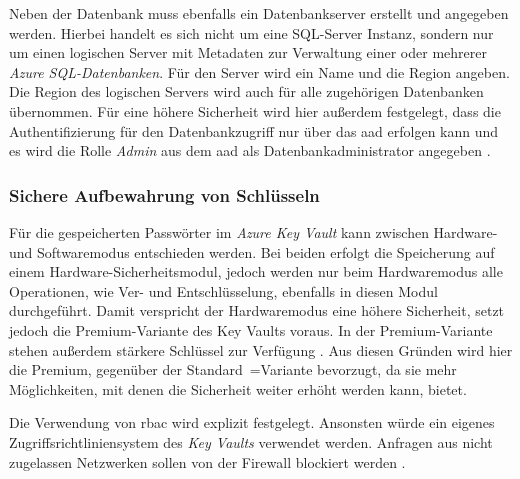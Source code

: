 Neben der Datenbank muss ebenfalls ein Datenbankserver erstellt und angegeben werden. Hierbei handelt es sich nicht um eine SQL-Server Instanz, sondern nur um einen logischen Server mit Metadaten zur Verwaltung einer oder mehrerer \textit{Azure SQL-Datenbanken}. Für den Server wird ein Name und die Region angeben. Die Region des logischen Servers wird auch für alle zugehörigen Datenbanken übernommen. Für eine höhere Sicherheit wird hier außerdem festgelegt, dass die Authentifizierung für den Datenbankzugriff nur über das \ac{aad} erfolgen kann und es wird die Rolle \textit{Admin} aus dem \ac{aad} als Datenbankadministrator angegeben  \cite[vgl.][]{ward_azure_2021}.

\subsubsection{Sichere Aufbewahrung von Schlüsseln} \label{subsec:infra:konfig:keyVault}
Für die gespeicherten Passwörter im \textit{Azure Key Vault} kann zwischen Hardware- und Softwaremodus entschieden werden. Bei beiden erfolgt die Speicherung auf einem Hardware-Sicherheitsmodul, jedoch werden nur beim Hardwaremodus alle Operationen, wie Ver- und Entschlüsselung, ebenfalls in diesen Modul durchgeführt. Damit verspricht der Hardwaremodus eine höhere Sicherheit, setzt jedoch die Premium-Variante des Key Vaults voraus. In der Premium-Variante stehen außerdem stärkere Schlüssel zur Verfügung \cite{haunts_key_2019}. Aus diesen Gründen wird hier die Premium, gegenüber der Standard~=Variante bevorzugt, da sie mehr Möglichkeiten, mit denen die Sicherheit weiter erhöht werden kann, bietet.

Die Verwendung von \ac{rbac} wird explizit festgelegt. Ansonsten würde ein eigenes Zugriffsrichtliniensystem des \textit{Key Vaults} verwendet werden. Anfragen aus nicht zugelassen Netzwerken sollen von der Firewall blockiert werden \cite[vgl.][]{herath_working_2022}.

